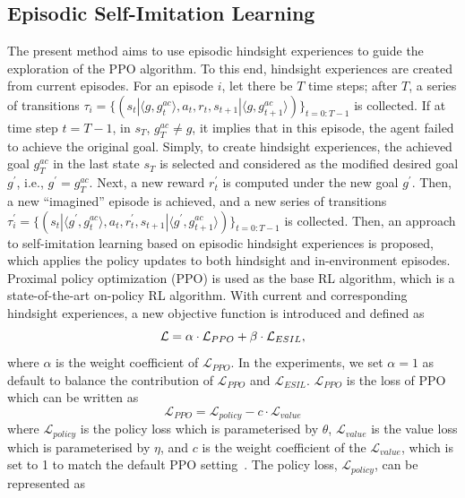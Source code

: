 \subsection{Episodic Self-Imitation Learning}
The present method aims to use episodic hindsight experiences to guide the exploration of the PPO algorithm. To this end, hindsight experiences are created from current episodes. For an episode $i$, let there be $T$ time steps; after $T$, a series of transitions $\tau_i =\{ (s_{t}|\langle g, g^{ac}_{t} \rangle, a_{t}, r_{t}, s_{t+1}|\langle g, g^{ac}_{t+1}\rangle )\}_{t=0:T-1}$ is collected. If at time step $t=T-1$, in $s_{T}$, $g^{ac}_{T} \neq g$, it implies that in this episode, the agent failed to achieve the original goal. Simply, to create hindsight experiences, {the achieved goal $g^{ac}_{T}$ in the last state $s_{T}$ is selected and considered as the modified desired goal $g^{\prime}$, i.e., $g^\prime = g^{ac}_{T}$.} Next, a new reward $r_{t}^{\prime}$ is computed under the new goal $g^\prime$. Then, {a new ``imagined'' episode is achieved}, and a new series of transitions $\tau_i^{\prime} = \{(s_{t}|\langle g^\prime, g^{ac}_{t} \rangle, a_{t}, r_{t}^{\prime},s_{t+1}| \langle g^\prime, g^{ac}_{t+1}\rangle )\}_{t=0:T-1}$ is collected.
Then, an approach to self-imitation learning based on episodic hindsight experiences is proposed, which applies the policy updates to both hindsight and in-environment episodes. Proximal policy optimization (PPO) is used as the base RL algorithm, which is a state-of-the-art on-policy RL algorithm. With current and corresponding hindsight experiences, a new objective function is introduced and defined as
\begin{equation}
  \centering
  \mathcal{L} = \alpha\cdot\mathcal{L}_{PPO} + \beta\cdot\mathcal{L}_{ESIL},
  \label{eq:loss}
\end{equation}
where $\alpha$ is the weight coefficient of $\mathcal{L}_{PPO}$. In the experiments, we set $\alpha=1$ as default {to balance the contribution of $\mathcal{L}_{PPO}$ and $\mathcal{L}_{ESIL}$}. $\mathcal{L}_{PPO}$ is the loss of PPO which can be written as
\begin{equation}
  \mathcal{L}_{PPO} = \mathcal{L}_{policy} - c\cdot \mathcal{L}_{value}
  \label{eq:ppo_loss}
\end{equation}
where $\mathcal{L}_{policy}$ is the policy loss which is parameterised by $\theta$, $\mathcal{L}_{value}$ is the value loss which is parameterised by $\eta$, and $c$ is the weight coefficient of the $\mathcal{L}_{value}$, which is set to 1 to match the default PPO setting~\cite{schulman2017proximal}. The policy loss, $\mathcal{L}_{policy}$, can be represented as
